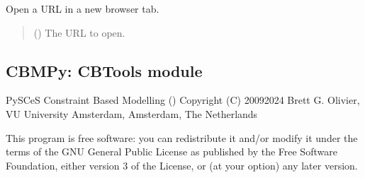 \documentclass[letterpaper,12pt,english]{sphinxmanual}
\begin{document}
\begin{fulllineitems}
\begin{fulllineitems}
\begin{quote}
\begin{description}
\end{description}\end{quote}

\end{fulllineitems}


\begin{fulllineitems}
\label{\detokenize{api/core:cbmpy.CBCommon.MIRIAMannotation.viewURL}}
\pysigstartsignatures
\pysiglinewithargsret
{}
{}
{}
\pysigstopsignatures
\sphinxAtStartPar
Open a URL in a new browser tab.
\begin{quote}\begin{description}
\sphinxAtStartPar
{} () \textendash{} The URL to open.

\sphinxAtStartPar
{}

\end{description}\end{quote}

\end{fulllineitems}


\end{fulllineitems}


\subsection{CBMPy: CBTools module}
\label{\detokenize{api/core:cbmpy-cbtools-module}}\label{\detokenize{api/core:module-cbmpy.CBTools}}
\sphinxAtStartPar
PySCeS Constraint Based Modelling ()
Copyright (C) 2009\sphinxhyphen{}2024 Brett G. Olivier, VU University Amsterdam, Amsterdam, The Netherlands

\sphinxAtStartPar
This program is free software: you can redistribute it and/or modify
it under the terms of the GNU General Public License as published by
the Free Software Foundation, either version 3 of the License, or
(at your option) any later version.
\end{document}
